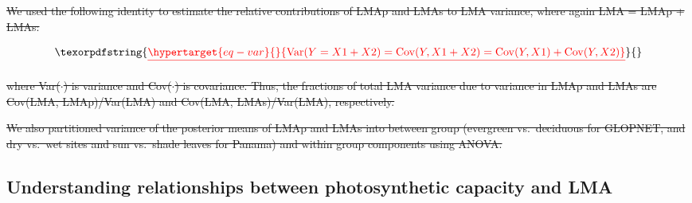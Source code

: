 \documentclass[
  12pt,
  letterpaper, %
  DIV=11, %
  numbers=noendperiod]{scrartcl} %
\providecommand{\DIFdeltex}[1]{{\protect\color{red}\sout{#1}}}                      %
\providecommand{\DIFdelend}{} %
\providecommand{\DIFdel}[1]{\texorpdfstring{\DIFdeltex{#1}}{}} %
\DeclareRobustCommand{\DIFdelend}{\DIFOaddend \let\includegraphics\DIFOincludegraphics} %
\begin{document}
\DIFdel{We used the following identity to estimate the relative contributions of
LMAp and LMAs to LMA variance, where again LMA = LMAp + LMAs:
}%

\begin{displaymath}\DIFdel{\protect\hypertarget{eq-var}{}{
\mathrm{Var}(Y = X1 + X2) = \mathrm{Cov}(Y, X1+X2) = \mathrm{Cov}(Y,X1) + \mathrm{Cov}(Y,X2)
}%
}\end{displaymath}%

\DIFdel{where Var(\(\cdot\)) is variance and Cov(\(\cdot\)) is covariance. Thus,
the fractions of total LMA variance due to variance in LMAp and LMAs are
Cov(LMA, LMAp)/Var(LMA) and Cov(LMA, LMAs)/Var(LMA), respectively.
}%

\DIFdel{We also partitioned variance of the posterior means of LMAp and LMAs
into between group (evergreen vs.~deciduous for GLOPNET, and dry vs.~wet
sites and sun vs.~shade leaves for Panama) and within group components
using ANOVA.
}%

\DIFdelend \hypertarget{understanding-relationships-between-photosynthetic-capacity-and-lma}{%
\subsection{Understanding relationships between photosynthetic capacity
and
LMA}\label{understanding-relationships-between-photosynthetic-capacity-and-lma}}
\end{document}
